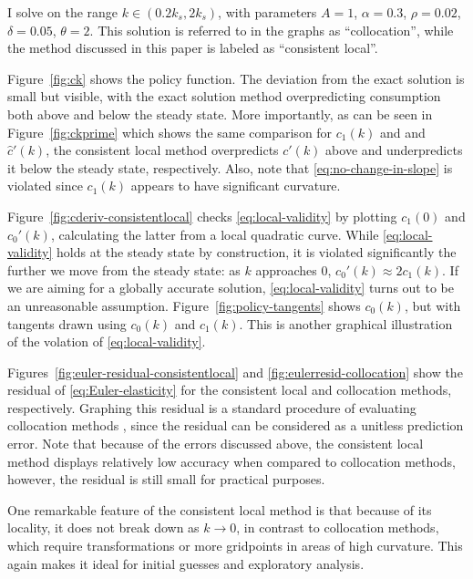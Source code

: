 \documentclass[a4paper,11pt]{article}
\newcommand{\hc}{\hat{c}}
\begin{document}
I solve on the range $k \in (0.2 k_s, 2 k_s)$, with parameters $A=1$, $\alpha=0.3$, $\rho=0.02$, $\delta=0.05$, $\theta=2$.  This solution is referred to in the graphs as ``collocation'', while the method discussed in this paper is labeled as ``consistent local''.

Figure~\ref{fig:ck} shows the policy function. The deviation from the exact solution is small but visible, with the exact solution method overpredicting consumption both above and below the steady state. More importantly, as can be seen in Figure~\ref{fig:ckprime} which shows the same comparison for $c_1(k)$ and and $\hc'(k)$, the consistent local method overpredicts $c'(k)$ above and underpredicts it below the steady state, respectively. Also, note that \eqref{eq:no-change-in-slope} is violated since $c_1(k)$ appears to have significant curvature.

Figure~\ref{fig:cderiv-consistentlocal} checks \eqref{eq:local-validity} by plotting $c_1(0)$ and $c_0'(k)$, calculating the latter from a local quadratic curve. While \eqref{eq:local-validity} holds at the steady state by construction, it is violated significantly the further we move from the steady state: as $k$ approaches $0$, $c_0'(k) \approx 2 c_1(k)$. If we are aiming for a globally accurate solution, \eqref{eq:local-validity} turns out to be an unreasonable assumption. Figure~\ref{fig:policy-tangents} shows $c_0(k)$, but with tangents drawn using $c_0(k)$ and $c_1(k)$. This is another graphical illustration of the volation of \eqref{eq:local-validity}.

Figures~\ref{fig:euler-residual-consistentlocal} and \ref{fig:eulerresid-collocation} show the residual of \eqref{eq:Euler-elasticity} for the consistent local and collocation methods, respectively. Graphing this residual is a standard procedure of evaluating collocation methods \parencite{boyd2001chebyshev, judd98:_numer_method_in_econom}, since the residual can be considered as a unitless prediction error. Note that because of the errors discussed above, the consistent local method displays relatively low accuracy when compared to collocation methods, however, the residual is still small for practical purposes.

One remarkable feature of the consistent local method is that because of its locality, it does not break down as $k\to0$, in contrast to collocation methods, which require transformations or more gridpoints in areas of high curvature. This again makes it ideal for initial guesses and exploratory analysis.
\end{document}
